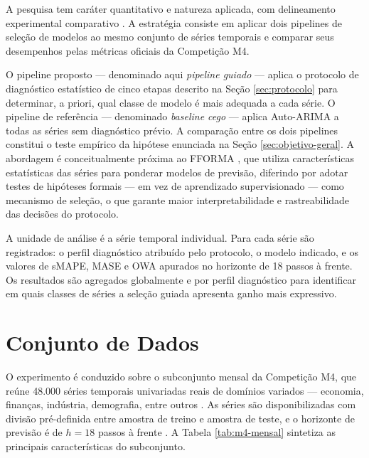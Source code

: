 \documentclass[
  12pt,
  openright,
  twoside,
  a4paper,
  english,
  brazil
]{abntex2}
\begin{document}
A pesquisa tem caráter quantitativo e natureza aplicada, com delineamento experimental comparativo \cite{gil2002pesquisa}. A estratégia consiste em aplicar dois pipelines de seleção de modelos ao mesmo conjunto de séries temporais e comparar seus desempenhos pelas métricas oficiais da Competição M4.

O pipeline proposto — denominado aqui \textit{pipeline guiado} — aplica o protocolo de diagnóstico estatístico de cinco etapas descrito na Seção \ref{sec:protocolo} para determinar, a priori, qual classe de modelo é mais adequada a cada série. O pipeline de referência — denominado \textit{baseline cego} — aplica Auto-ARIMA a todas as séries sem diagnóstico prévio. A comparação entre os dois pipelines constitui o teste empírico da hipótese enunciada na Seção \ref{sec:objetivo-geral}. A abordagem é conceitualmente próxima ao FFORMA \cite{montero2020fforma}, que utiliza características estatísticas das séries para ponderar modelos de previsão, diferindo por adotar testes de hipóteses formais — em vez de aprendizado supervisionado — como mecanismo de seleção, o que garante maior interpretabilidade e rastreabilidade das decisões do protocolo.

A unidade de análise é a série temporal individual. Para cada série são registrados: o perfil diagnóstico atribuído pelo protocolo, o modelo indicado, e os valores de sMAPE, MASE e OWA apurados no horizonte de 18 passos à frente. Os resultados são agregados globalmente e por perfil diagnóstico para identificar em quais classes de séries a seleção guiada apresenta ganho mais expressivo.

\section{Conjunto de Dados}
\label{sec:dados}

O experimento é conduzido sobre o subconjunto mensal da Competição M4, que reúne 48.000 séries temporais univariadas reais de domínios variados — economia, finanças, indústria, demografia, entre outros \cite{makridakis2020m4}. As séries são disponibilizadas com divisão pré-definida entre amostra de treino e amostra de teste, e o horizonte de previsão é de $h = 18$ passos à frente \cite{makridakis2020m4}. A Tabela \ref{tab:m4-mensal} sintetiza as principais características do subconjunto.
\end{document}
